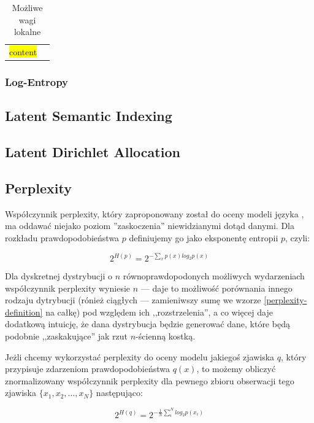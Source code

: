 \documentclass[11pt,a4paper]{article}
\newcommand{\todo}[1]{\colorbox{yellow}{#1}}
\begin{document}
\begin{table}[h]
\caption{Możliwe wagi lokalne}
\label{local-weights}
\begin{tabular}{|c|p{\linewidth}|}
\todo{content}
\end{tabular}
\end{table}

\subsubsection{Log-Entropy}
\subsection{Latent Semantic Indexing}
\subsection{Latent Dirichlet Allocation}
\label{sec:lda}
\subsection{Perplexity}

Współczynnik perplexity, który zaproponowany został do oceny modeli języka
\cite{bahl-perplexity}, ma oddawać niejako poziom ''zaskoczenia'' niewidzianymi
dotąd danymi. Dla rozkładu prawdopodobieństwa $p$ definiujemy go jako
eksponentę entropii $p$, czyli:

\begin{equation}
  \label{perplexity-definition}
  2^{H(p)} = 2^{-\sum_x p(x)log_2 p(x)}
\end{equation}

Dla dyskretnej dystrybucji o $n$ równoprawdopodonych możliwych wydarzeniach
współczynnik perplexity wyniesie $n$ --- daje to możliwość porównania innego
rodzaju dytrybucji (rónież ciągłych --- zamieniwszy sumę we wzorze
\ref{perplexity-definition} na całkę) pod względem ich ,,rozstrzelenia'', a co
więcej daje dodatkową intuicję, że dana dystrybucja będzie generować dane,
które będą podobnie ,,zaskakujące'' jak rzut $n$-ścienną kostką.

Jeżli chcemy wykorzystać perplexity do oceny modelu jakiegoś zjawiska $q$,
który przypisuje zdarzeniom prawdopodobieństwa $q(x)$, to możemy obliczyć
znormalizowany współczynnik perplexity dla pewnego zbioru obserwacji tego zjawiska
$\{x_1, x_2, \ldots, x_N\}$ następująco:

\begin{equation}
  2^{H(q)} = 2^{-\frac{1}{N}\sum_i^N log_2 p(x_i)}
\end{equation}
\end{document}
